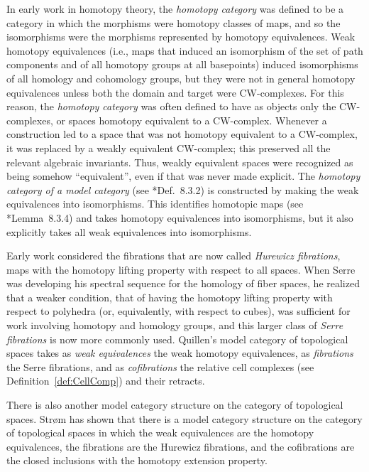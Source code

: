 \documentclass[12pt]{amsart}
\numberwithin{equation}{section}
\theoremstyle{slplain}
\theoremstyle{definition}
\theoremstyle{remark}
\newcommand{\defref}{Definition~\ref}
\begin{document}
In early work in homotopy theory, the \emph{homotopy category} was
defined to be a category in which the morphisms were homotopy classes
of maps, and so the isomorphisms were the morphisms represented by
homotopy equivalences.  Weak homotopy equivalences (i.e., maps that
induced an isomorphism of the set of path components and of all
homotopy groups at all basepoints) induced isomorphisms of all
homology and cohomology groups, but they were not in general homotopy
equivalences unless both the domain and target were CW-complexes.  For
this reason, the \emph{homotopy category} was often defined to have as
objects only the CW-complexes, or spaces homotopy equivalent to a
CW-complex.  Whenever a construction led to a space that was not
homotopy equivalent to a CW-complex, it was replaced by a weakly
equivalent CW-complex; this preserved all the relevant algebraic
invariants.  Thus, weakly equivalent spaces were recognized as being
somehow ``equivalent'', even if that was never made explicit.  The
\emph{homotopy category of a model category} (see
\cite{MCATL}*{Def.~8.3.2}) is constructed by making the weak
equivalences into isomorphisms.  This identifies homotopic maps (see
\cite{MCATL}*{Lemma~8.3.4}) and takes homotopy equivalences into
isomorphisms, but it also explicitly takes all weak equivalences into
isomorphisms.

Early work considered the fibrations that are now called
\emph{Hurewicz fibrations}, maps with the homotopy lifting property
with respect to all spaces.  When Serre \cite{Serre} was developing
his spectral sequence for the homology of fiber spaces, he realized
that a weaker condition, that of having the homotopy lifting property
with respect to polyhedra (or, equivalently, with respect to cubes),
was sufficient for work involving homotopy and homology groups, and
this larger class of \emph{Serre fibrations} is now more commonly
used.  Quillen's model category of topological spaces takes as
\emph{weak equivalences} the weak homotopy equivalences, as
\emph{fibrations} the Serre fibrations, and as \emph{cofibrations} the
relative cell complexes (see \defref{def:CellComp}) and their
retracts.

There is also another model category structure on the category of
topological spaces.  Str{\o}m \cite{Strom:HC} has shown that there is
a model category structure on the category of topological spaces in
which the weak equivalences are the homotopy equivalences, the
fibrations are the Hurewicz fibrations, and the cofibrations are the
closed inclusions with the homotopy extension property.
\end{document}
